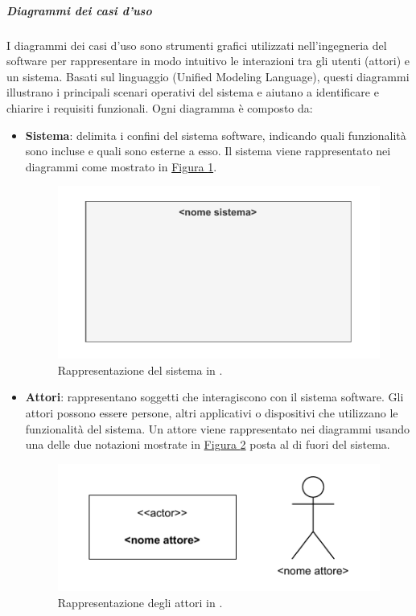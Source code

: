 \subparagraph{Diagrammi dei casi d'uso}
I diagrammi dei casi d'uso sono strumenti grafici utilizzati nell'ingegneria del software per rappresentare in modo intuitivo le interazioni tra gli utenti (attori) e un sistema. Basati sul linguaggio  (Unified Modeling Language), questi diagrammi illustrano i principali scenari operativi del sistema e aiutano a identificare e chiarire i requisiti funzionali.
Ogni diagramma è composto da:
\begin{itemize}
    \item \textbf{Sistema}: delimita i confini del sistema software, indicando quali funzionalità sono incluse e quali sono esterne a esso.
    Il sistema viene rappresentato nei diagrammi come mostrato in \hyperref[fig:sistema_uml]{Figura \ref{fig:sistema_uml}}.
    \begin{figure}[H]
        \centering
        \includegraphics{Sezioni/ProcessiPrimari/Immagini/sistema_caso_uso.pdf}
        \caption{Rappresentazione del sistema in .}
        \label{fig:sistema_uml}
    \end{figure}
    
    \item \textbf{Attori}: rappresentano soggetti che interagiscono con il sistema software. Gli attori possono essere persone, altri applicativi o dispositivi che utilizzano le funzionalità del sistema.
    Un attore viene rappresentato nei diagrammi usando una delle due notazioni mostrate in \hyperref[fig:attori_uml]{Figura \ref{fig:attori_uml}} posta al di fuori del sistema.
    \begin{figure}[H]
        \centering
        \includegraphics{Sezioni/ProcessiPrimari/Immagini/attori_caso_uso.pdf}
        \caption{Rappresentazione degli attori in .}
        \label{fig:attori_uml}
    \end{figure}
    

\end{itemize}
